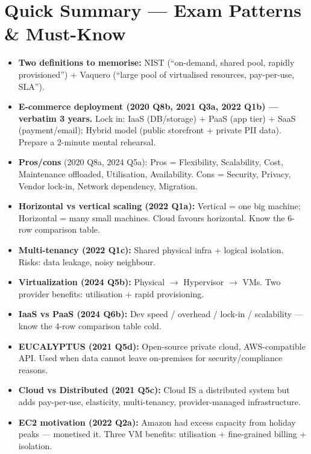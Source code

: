 \documentclass[12pt, a4paper]{article}
\newenvironment{notesbox}{\begin{mdframed}[style=notesframe]}{\end{mdframed}}
\begin{document}
\section{Quick Summary --- Exam Patterns \& Must-Know}
\begin{notesbox}
\begin{itemize}[leftmargin=1.3cm, itemsep=3pt]
  \item \textbf{Two definitions to memorise:} NIST (``on-demand, shared pool, rapidly
    provisioned'') + Vaquero (``large pool of virtualised resources, pay-per-use, SLA'').
  \item \textbf{E-commerce deployment (2020 Q8b, 2021 Q3a, 2022 Q1b) --- verbatim 3 years.}
    Lock in: IaaS (DB/storage) + PaaS (app tier) + SaaS (payment/email); Hybrid model (public
    storefront + private PII data). Prepare a 2-minute mental rehearsal.
  \item \textbf{Pros/cons} (2020 Q8a, 2024 Q5a): Pros = Flexibility, Scalability, Cost, Maintenance
    offloaded, Utilisation, Availability. Cons = Security, Privacy, Vendor lock-in, Network
    dependency, Migration.
  \item \textbf{Horizontal vs vertical scaling (2022 Q1a):} Vertical = one big machine; Horizontal
    = many small machines. Cloud favours horizontal. Know the 6-row comparison table.
  \item \textbf{Multi-tenancy (2022 Q1c):} Shared physical infra + logical isolation. Risks:
    data leakage, noisy neighbour.
  \item \textbf{Virtualization (2024 Q5b):} Physical $\rightarrow$ Hypervisor $\rightarrow$
    VMs. Two provider benefits: utilisation + rapid provisioning.
  \item \textbf{IaaS vs PaaS (2024 Q6b):} Dev speed / overhead / lock-in / scalability ---
    know the 4-row comparison table cold.
  \item \textbf{EUCALYPTUS (2021 Q5d):} Open-source private cloud, AWS-compatible API. Used
    when data cannot leave on-premises for security/compliance reasons.
  \item \textbf{Cloud vs Distributed (2021 Q5c):} Cloud IS a distributed system but adds
    pay-per-use, elasticity, multi-tenancy, provider-managed infrastructure.
  \item \textbf{EC2 motivation (2022 Q2a):} Amazon had excess capacity from holiday peaks ---
    monetised it. Three VM benefits: utilisation + fine-grained billing + isolation.
\end{itemize}
\end{notesbox}
\end{document}
